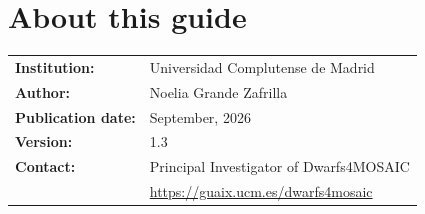 
%
%
%
%
%



\providecommand{\role}{both}


\newcommand{\project}{\textsf{Dwarfs4MOSAIC}\xspace}
\newcommand{\prjInstitution}{Universidad Complutense de Madrid\xspace}
\newcommand{\prjAuthor}{Noelia Grande Zafrilla\xspace}
\newcommand{\prjPubDate}{September, 2026\xspace} %
\newcommand{\prjVersion}{1.3\xspace}
\newcommand{\prjContact}{Principal Investigator of Dwarfs4MOSAIC\xspace}
\newcommand{\prjGuaix}{\url{https://guaix.ucm.es/dwarfs4mosaic}\xspace}
\newcommand{\prjUrl}{\url{https://guaix.ucm.es/dwarfs4mosaic-data}\xspace}



	
	\pagestyle{empty}   %
	
	
	
	\setlength{\parskip}{1em}    %
	\setlength{\parindent}{0pt}  %
	
	\section*{About this guide}
	
	\begin{flushleft}
		\begin{tabular}{ll}
			\textbf{Institution:} & \prjInstitution \\
			\textbf{Author:} & \prjAuthor \\
			\textbf{Publication date:} & \prjPubDate \\
			\textbf{Version:} & \prjVersion \\
			\textbf{Contact:} & \prjContact \\
			\                 & \prjGuaix \\
		\end{tabular}
	\end{flushleft}
	
